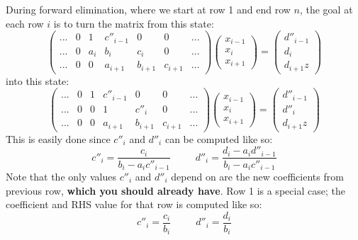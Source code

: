 \documentclass{article}
\begin{document}
During forward elimination, where we start at row 1 and end row $n$, the goal at each row $i$ is to turn the matrix from this state:
\begin{equation}
	\left( \begin{matrix}
	... & 0 & 1 & c''_{i - 1} & 0 & 0 & ... \\
	... & 0 & a_i & b_i & c_i & 0 & ... \\
	... & 0 & 0 & a_{i+1} & b_{i+1} & c_{i+1} & ...
	\end{matrix} \right)
	\left( \begin{matrix}
	x_{i - 1} \\
	x_i \\
	x_{i + 1}
	\end{matrix} \right)
	=
	\left( \begin{matrix}
	d''_{i - 1} \\
	d_i \\
	d_{i+1}	z
	\end{matrix} \right)
\end{equation}
into this state:
\begin{equation}
	\left( \begin{matrix}
	... & 0 & 1 & c''_{i - 1} & 0 & 0 & ... \\
	... & 0 & 0 & 1 & c''_i & 0 & ... \\
	... & 0 & 0 & a_{i+1} & b_{i+1} & c_{i+1} & ...
	\end{matrix} \right)
	\left( \begin{matrix}
	x_{i - 1} \\
	x_i \\
	x_{i + 1}
	\end{matrix} \right)
	=
	\left( \begin{matrix}
	d''_{i - 1} \\
	d''_i \\
	d_{i+1}	z
	\end{matrix} \right)
\end{equation}
This is easily done since $c''_i$ and $d''_i$ can be computed like so:
\begin{equation}
	c''_i = \frac{c_i}{b_i - a_ic''_{i-1}}
	\;\;\;\;\;\;\;\;\;
	d''_i = \frac{d_i - a_i d''_{i-1}}{b_i - a_ic''_{i-1}}	
\end{equation}
Note that the only values $c''_i$ and $d''_i$ depend on are the new coefficients from previous row, \textbf{which you should already have}. Row 1 is a special case; the coefficient and RHS value for that row is computed like so:
\begin{equation}
	c''_i = \frac{c_i}{b_i}
	\;\;\;\;\;\;\;\;\;
	d''_i = \frac{d_i}{b_i}
\end{equation}
\end{document}
